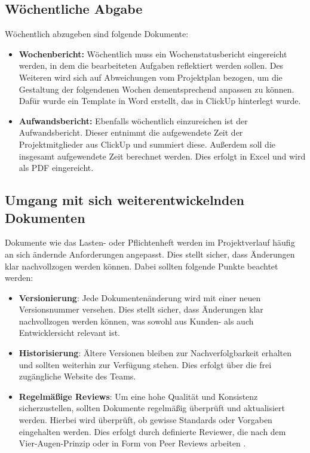 \documentclass[a4paper,12pt]{article}
\begin{document}
\subsection{Wöchentliche Abgabe}
Wöchentlich abzugeben sind folgende Dokumente:
\begin{itemize}
    \item \textbf{Wochenbericht:} Wöchentlich muss ein Wochenstatusbericht eingereicht werden, in dem die bearbeiteten Aufgaben reflektiert werden sollen. Des Weiteren wird sich auf Abweichungen vom Projektplan bezogen, um die Gestaltung der folgendenen Wochen dementsprechend anpassen zu können. Dafür wurde ein Template in Word erstellt, das in ClickUp hinterlegt wurde.
    \item \textbf{Aufwandsbericht:} Ebenfalls wöchentlich einzureichen ist der Aufwandsbericht. Dieser entnimmt die aufgewendete Zeit der Projektmitglieder aus ClickUp und summiert diese. Außerdem soll die insgesamt aufgewendete Zeit berechnet werden. Dies erfolgt in Excel und wird als PDF eingereicht.
\end{itemize}

\subsection{Umgang mit sich weiterentwickelnden Dokumenten}
Dokumente wie das Lasten- oder Pflichtenheft werden im Projektverlauf häufig an sich ändernde Anforderungen angepasst. Dies stellt sicher, dass Änderungen klar nachvollzogen werden können. Dabei sollten folgende Punkte beachtet werden:
\begin{itemize}
    \item \textbf{Versionierung}: Jede Dokumentenänderung wird mit einer neuen Versionsnummer versehen. Dies stellt sicher, dass Änderungen klar nachvollzogen werden können, was sowohl aus Kunden- als auch Entwicklersicht relevant ist.
    \item \textbf{Historisierung}: Ältere Versionen bleiben zur Nachverfolgbarkeit erhalten und sollten weiterhin zur Verfügung stehen. Dies erfolgt über die frei zugängliche Website des Teams.
    \item \textbf{Regelmäßige Reviews}: Um eine hohe Qualität und Konsistenz sicherzustellen, sollten Dokumente regelmäßig überprüft und aktualisiert werden. Hierbei wird überprüft, ob gewisse Standards oder Vorgaben eingehalten werden. Dies erfolgt durch definierte Reviewer, die nach dem Vier-Augen-Prinzip oder in Form von Peer Reviews arbeiten \cite{studysmarter_dokumentationsreview_nodate}.
\end{itemize}

\newpage
\printbibliography
\end{document}
